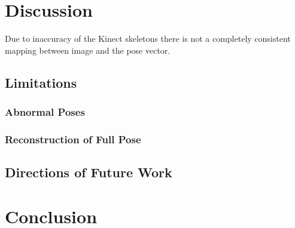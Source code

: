 \documentclass[11pt]{article} %
\begin{document}
\section{Discussion}
\label{sec:discussion}
Due to inaccuracy of the Kinect skeletons there is not a completely consistent mapping between image and the pose vector. 

\subsection{Limitations}

\subsubsection{Abnormal Poses}
\label{sec:abnormals}

\subsubsection{Reconstruction of Full Pose}

\subsection{Directions of Future Work}


\section{Conclusion}







%
\end{document}
